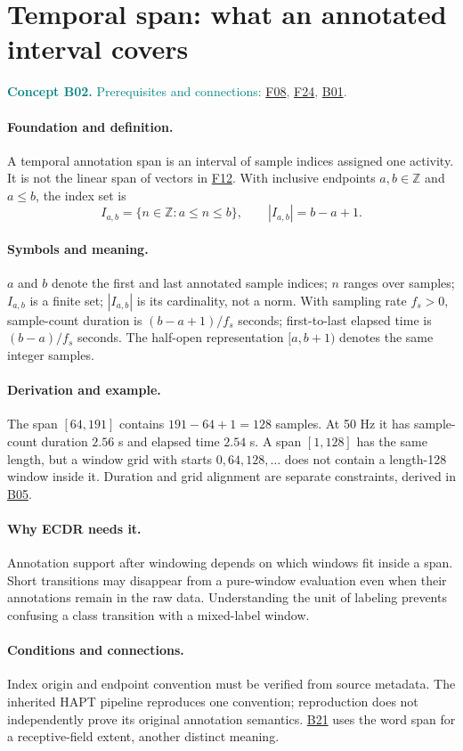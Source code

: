 \documentclass[11pt,a4paper]{article}
\newcommand{\conceptid}{Front matter}
\newcommand{\concept}[3]{\clearpage\renewcommand{\conceptid}{#1}%
\section{#2}\label{concept:#1}%
\textcolor{teal}{\textbf{Concept #1.} Prerequisites and connections: #3.}\par
\typeout{ECDR-CONCEPT-START #1 PAGE=\thepage}}
\begin{document}
\concept{B02}{Temporal span: what an annotated interval covers}{\hyperref[concept:F08]{F08}, \hyperref[concept:F24]{F24}, \hyperref[concept:B01]{B01}}
\paragraph{Foundation and definition.}
A temporal annotation span is an interval of sample indices assigned one
activity. It is not the linear span of vectors in \hyperref[concept:F12]{F12}. With inclusive
endpoints $a,b\in\mathbb Z$ and $a\le b$, the index set is
\[
 I_{a,b}=\{n\in\mathbb Z:a\le n\le b\},\qquad |I_{a,b}|=b-a+1.
\]
\paragraph{Symbols and meaning.}
$a$ and $b$ denote the first and last annotated sample indices; $n$ ranges
over samples; $I_{a,b}$ is a finite set; $|I_{a,b}|$ is its cardinality,
not a norm. With sampling rate $f_s>0$, sample-count duration is
$(b-a+1)/f_s$ seconds; first-to-last elapsed time is $(b-a)/f_s$ seconds.
The half-open representation $[a,b+1)$ denotes the same integer samples.
\paragraph{Derivation and example.}
The span $[64,191]$ contains $191-64+1=128$ samples. At 50 Hz it has
sample-count duration $2.56$ s and elapsed time $2.54$ s. A span $[1,128]$
has the same length, but a window grid with starts $0,64,128,\ldots$ does
not contain a length-128 window inside it. Duration and grid alignment
are separate constraints, derived in \hyperref[concept:B05]{B05}.
\paragraph{Why ECDR needs it.}
Annotation support after windowing depends on which windows fit inside a
span. Short transitions may disappear from a pure-window evaluation even
when their annotations remain in the raw data. Understanding the unit of
labeling prevents confusing a class transition with a mixed-label window.
\paragraph{Conditions and connections.}
Index origin and endpoint convention must be verified from source metadata.
The inherited HAPT pipeline reproduces one convention; reproduction does
not independently prove its original annotation semantics. \hyperref[concept:B21]{B21} uses the
word span for a receptive-field extent, another distinct meaning.
\par\label{endconcept:B02}
\end{document}

